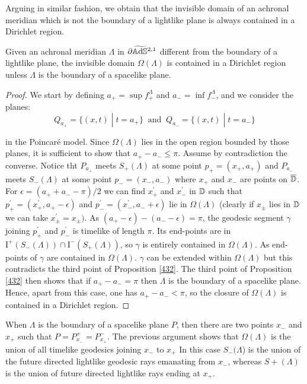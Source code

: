 Arguing in similar fashion, we obtain that the invisible domain of an achronal meridian which is not the boundary of a lightlike plane is always contained in a Dirichlet region. 

\begin{proposition}\label{433}
    Given an achronal meridian $\Lambda$ in $\partial\widetilde{\mathbb{A}\mathrm{d}\mathbb{S}}{}^{2,1}$ different from the boundary of a lightlike plane, the invisible domain $\Omega(\Lambda)$ is contained in a Dirichlet region unless $\Lambda$ is the boundary of a spacelike plane. 
\end{proposition}
\begin{proof}
    We start by defining $a_+=\sup f_+^{\Lambda}$ and $a_-=\inf f_-^{\Lambda}$, and we consider the planes: 
    \[
        Q_{a_+}=\{(x,t)\;|\;t=a_+\} \;\;\text{and}\;\; Q_{a_-}=\{(x,t)\;|\;t=a_-\}
   \]

   in the Poincaré model. Since $\Omega(\Lambda)$ lies in the open region bounded by those planes, it is sufficient to show that $a_+-a_-\leq\pi.$ Assume by contradiction the converse. Notice tht $P_{a_+}$ meets $S_+(\Lambda)$ at some point $p_+=(x_+,a_+)$ and $P_{a_-}$ meets $S_-(\Lambda)$ at some point $p_-=(x_-,a_-)$ where $x_+$ and $x_-$ are points on $\overline{\mathbb{D}}$. For $\epsilon=(a_+ + a_- -\pi )/2$ we can find $x^{\prime}_+$ and $x_-^{\prime} $ in $\mathbb{D}$ such that $p_+^{\prime}=(x^{\prime}_+,a_+-\epsilon)$ and $p_-^{\prime}=(x_-^{\prime},a_- +\epsilon)$ lie in $\Omega(\Lambda)$ (clearly if $x_\pm$ lies in $\mathbb{D}$ we can take $x_\pm^{\prime}=x_\pm)$. As $(a_+-\epsilon)-(a_- - \epsilon )=\pi$, the geodesic segment $\gamma$ joining $p_+^{\prime}$ and $p_-^{\prime}$ is timelike of length $\pi$. Its end-points are in $\text{I}^+(S_-(\Lambda))\cap\text{I}^-(S_+(\Lambda))$, so $\gamma$ is entirely contained in $\Omega(\Lambda)$. As end-points of $\gamma$ are contained in $\Omega(\Lambda).$ $\gamma$ can be extended within $\Omega(\Lambda)$ but this contradicts the third point of Proposition \ref{432}.       
   The third point of Proposition \ref{432} then shows that if $a_+-a_-=\pi$ then $\Lambda$ is the boundary of a spacelike plane. Hence, apart from this case, one has $a_+ - a_-<\pi$, so the closure of $\Omega(\Lambda)$ is contained in a Dirichlet region. 

\end{proof}
    
\begin{observation}
    When $\Lambda$ is the boundary of a spacelike plane $P$, then there are two points $x_-$ and $x_+$ such that $P=P_{x_-}^+=P_{x_+}^-.$ The previous argument shows that $\Omega(\Lambda)$ is the union of all timelike geodesics joining $x_-$ to $x_+$ In this case $S_-(\Lambda$) is the union of the future directed lightlike geodesic rays emanating from $x_-$, whereas $S+(\Lambda)$ is the union of future directed lightlike rays ending at $x_+$.  
\end{observation}

